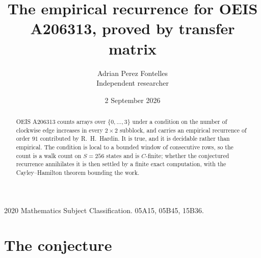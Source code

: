 \documentclass[11pt,a4paper]{article}
\title{The empirical recurrence for OEIS A206313, proved by transfer matrix}
\author{Adrian Perez Fontelles\\ \small Independent researcher}
\date{2 September 2026}
\theoremstyle{plain}
\theoremstyle{definition}
\begin{document}
\maketitle

\begin{abstract}
OEIS A206313 counts arrays over $\{0,\dots,3\}$ under a condition on the number of clockwise edge increases
in every $2\times2$ subblock, and carries an empirical recurrence of order $91$ contributed by
R.~H.~Hardin. It is true, and it is decidable rather than empirical. The condition is local to
a bounded window of consecutive rows, so the count is a walk count on $S=256$ states and is
$C$-finite; whether the conjectured recurrence annihilates it is then settled by a finite exact
computation, with the Cayley--Hamilton theorem bounding the work.
\end{abstract}

\noindent\small 2020 Mathematics Subject Classification. 05A15, 05B45, 15B36.\normalsize

\section{The conjecture}
\end{document}
